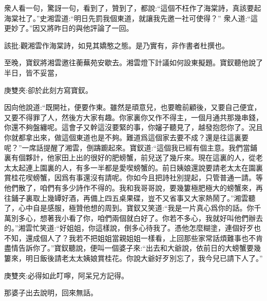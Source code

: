 \begin{parag}
    衆人看一句，驚訝一句，看到了，贊到了，都說:“這個不枉作了海棠詩，真該要起海棠社了。”史湘雲道:“明日先罰我個東道，就讓我先邀一社可使得？” 衆人道:“這更妙了。”因又將昨日的與他評論了一回。\begin{note}該批:觀湘雲作海棠詩，如見其嬌憨之態。是乃實有，非作書者杜撰也。\end{note}
\end{parag}


\begin{parag}
    至晚，寶釵將湘雲邀往蘅蕪苑安歇去。湘雲燈下計議如何設東擬題。寶釵聽他說了半日，皆不妥當，\begin{note}庚雙夾:卻於此刻方寫寶釵。\end{note}因向他說道:“既開社，便要作東。雖然是頑意兒，也要瞻前顧後，又要自己便宜，又要不得罪了人，然後方大家有趣。你家裏你又作不得主，一個月通共那幾串錢，你還不夠盤纏呢。這會子又幹這沒要緊的事，你嬸子聽見了，越發抱怨你了。況且你就都拿出來，做這個東道也是不夠。難道爲這個家去要不成？還是往這裏要呢？”一席話提醒了湘雲，倒躊躕起來。寶釵道:“這個我已經有個主意。我們當鋪裏有個夥計，他家田上出的很好的肥螃蟹，前兒送了幾斤來。現在這裏的人，從老太太起連上園裏的人，有多一半都是愛喫螃蟹的。前日姨娘還說要請老太太在園裏賞桂花喫螃蟹，因爲有事還沒有請呢。你如今且把詩社別提起，只管普通一請。等他們散了，咱們有多少詩作不得的。我和我哥哥說，要幾簍極肥極大的螃蟹來，再往鋪子裏取上幾罈好酒，再備上四五桌果碟，豈不又省事又大家熱鬧了。”湘雲聽了，心中自是感服，極贊他想的周到。寶釵又笑道:“我是一片真心爲你的話。你千萬別多心，想著我小看了你，咱們兩個就白好了。你若不多心，我就好叫他們辦去的。”湘雲忙笑道:“好姐姐，你這樣說，倒多心待我了。憑他怎麼糊塗，連個好歹也不知，還成個人了？我若不把姐姐當親姐姐一樣看，上回那些家常話煩難事也不肯盡情告訴你了。”寶釵聽說，便叫一個婆子來:“出去和大爺說，依前日的大螃蟹要幾簍來，明日飯後請老太太姨娘賞桂花。你說大爺好歹別忘了，我今兒已請下人了。”\begin{note}庚雙夾:必得如此叮嚀，阿呆兄方記得。\end{note}那婆子出去說明，回來無話。
\end{parag}


